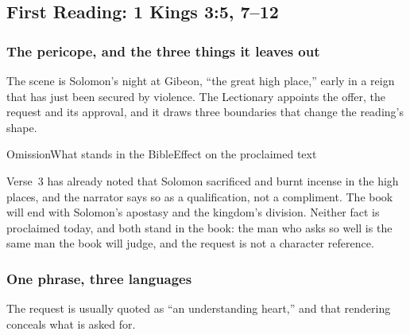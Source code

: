 \subsection*{First Reading: 1 Kings 3:5, 7--12}

\subsubsection*{The pericope, and the three things it leaves out}

The scene is Solomon's night at Gibeon, ``the great high place,'' early in a reign that has just been secured by violence. The Lectionary appoints the offer, the request and its approval, and it draws three boundaries that change the reading's shape.

\begin{threecoltable}{Omission}{What stands in the Bible}{Effect on the proclaimed text}
\end{threecoltable}

Verse~3 has already noted that Solomon sacrificed and burnt incense in the high places, and the narrator says so as a qualification, not a compliment. The book will end with Solomon's apostasy and the kingdom's division. Neither fact is proclaimed today, and both stand in the book: the man who asks so well is the same man the book will judge, and the request is not a character reference.

\subsubsection*{One phrase, three languages}

The request is usually quoted as ``an understanding heart,'' and that rendering conceals what is asked for.

